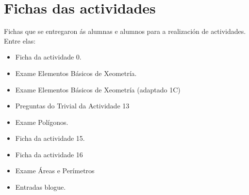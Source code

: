 

\chapter{Fichas das actividades}\label{chap:fich-act}

Fichas que se entregaron ás alumnas e alumnos para a realización de actividades. Entre elas:

\begin{itemize}
  \item Ficha da actividade 0.
  \item Exame Elementos Básicos de Xeometría.
  \item Exame Elementos Básicos de Xeometría (adaptado 1C)
  \item Preguntas do Trivial da Actividade 13
  \item Exame Polígonos.
  \item Ficha da actividade 15.
  \item Ficha da actividade 16
  \item Exame Áreas e Perímetros
  \item Entradas blogue.
\end{itemize}
\newpage












